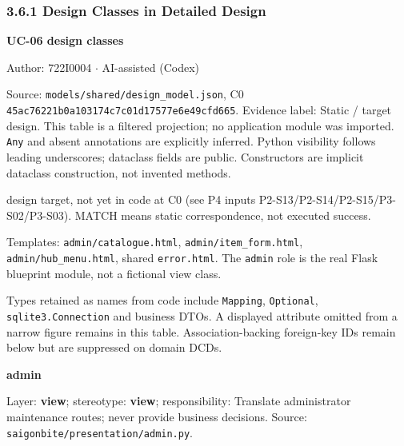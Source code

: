 \subsubsection*{3.6.1 Design Classes in Detailed Design}
\textbf{UC-06 design classes}

Author: 722I0004 \ensuremath{\cdot} AI-assisted (Codex)

Source: \texttt{models/\allowbreak{}shared/\allowbreak{}design\_\allowbreak{}model.\allowbreak{}json}, C0 \texttt{45ac76221b0a103174c7c01d17577e6e49cfd665}. Evidence label: Static / target design. This table is a filtered projection; no application module was imported. \texttt{Any} and absent annotations are explicitly inferred. Python visibility follows leading underscores; dataclass fields are public. Constructors are implicit dataclass construction, not invented methods.

design target, not yet in code at C0 (see P4 inputs P2-S13/P2-S14/P2-S15/P3-S02/P3-S03). MATCH means static correspondence, not executed success.

Templates: \texttt{admin/\allowbreak{}catalogue.\allowbreak{}html}, \texttt{admin/\allowbreak{}item\_\allowbreak{}form.\allowbreak{}html}, \texttt{admin/\allowbreak{}hub\_\allowbreak{}menu.\allowbreak{}html}, shared \texttt{error.\allowbreak{}html}. The \texttt{admin} role is the real Flask blueprint module, not a fictional view class.

Types retained as names from code include \texttt{Mapping}, \texttt{Optional}, \texttt{sqlite3.\allowbreak{}Connection} and business DTOs. A displayed attribute omitted from a narrow figure remains in this table. Association-backing foreign-key IDs remain below but are suppressed on domain DCDs.

\textbf{admin}

Layer: \textbf{view}; stereotype: \textbf{\guillemotleft{}view\guillemotright{}}; responsibility: Translate administrator maintenance routes; never provide business decisions. Source: \texttt{saigonbite/\allowbreak{}presentation/\allowbreak{}admin.\allowbreak{}py}.


